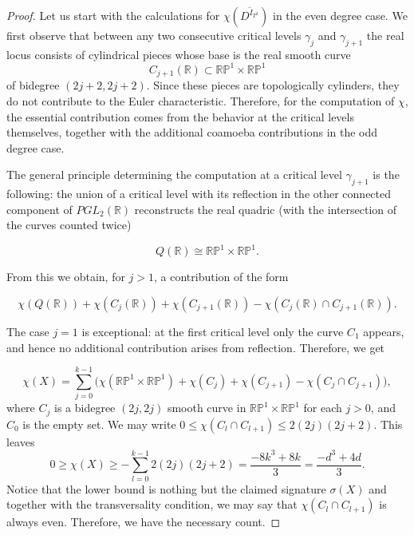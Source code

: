 \documentclass[10pt,a4paper]{amsart}
\begin{document}
\begin{proof}
	Let us start with the calculations for $\chi(\overline{D^{I_{T^2}}})$ in the even degree case. We first observe that between any two consecutive critical levels $\gamma_j$ and $\gamma_{j+1}$ the real locus consists of cylindrical pieces whose base is the real smooth curve 
	\[
	C_{j+1}(\mathbb{R}) \subset \mathbb{RP}^1 \times \mathbb{RP}^1
	\]
	of bidegree $(2j+2,2j+2)$. Since these pieces are topologically cylinders, they do not contribute to the Euler characteristic. Therefore, for the computation of $\chi$, the essential contribution comes from the behavior at the critical levels themselves, together with the additional coamoeba contributions in the odd degree case.
	
	The general principle determining the computation at a critical level $\gamma_{j+1}$ is the following: the union of a critical level with its reflection in the other connected component of $PGL_2(\mathbb{R})$ reconstructs the real quadric (with the intersection of the curves counted twice)
	
	$$Q(\mathbb{R}) \cong \mathbb{RP}^1 \times \mathbb{RP}^1.$$
	
	From this we obtain, for $j>1$, a contribution of the form
	
	$$\chi\!\left(Q(\mathbb{R})\right)
	+\chi\!\left(C_j(\mathbb{R})\right)
	+\chi\!\left(C_{j+1}(\mathbb{R})\right)
	-\chi\!\left(C_j(\mathbb{R}) \cap C_{j+1}(\mathbb{R})\right).$$
	
	The case $j=1$ is exceptional: at the first critical level only the curve $C_1$ appears, and hence no additional contribution arises from reflection.
	Therefore, we get 
	
	$$\chi(X)=\sum_{j=0}^{k-1}\big(\chi(\mathbb{RP}^1\times\mathbb{RP}^1)+\chi(C_j)+\chi(C_{j+1})-\chi(C_j\cap C_{j+1})\big),$$
	where $C_j$ is a bidegree $(2j,2j)$ smooth curve in $\mathbb{RP}^1\times\mathbb{RP}^1$ for each $j>0$, and $C_0$ is the empty set. We may write $0\leq\chi(C_l\cap C_{l+1})\leq 2(2j)(2j+2)$. This leaves 
	$$0\geq \chi(X)\geq -\sum_{l=0}^{k-1}2(2j)(2j+2)=\dfrac{-8k^3+8k}{3}=\dfrac{-d^3+4d}{3}.$$	
	Notice that the lower bound is nothing but the claimed signature $\sigma(X)$ and together with the transversality condition, we may say that $\chi(C_l\cap C_{l+1})$ is always even. Therefore, we have the necessary count. 
	

\end{proof}
\end{document}
